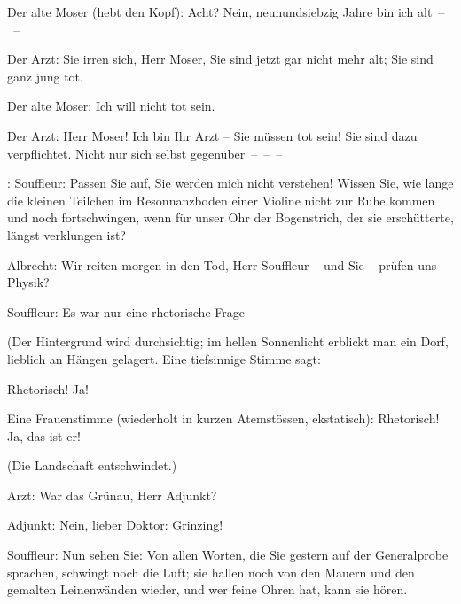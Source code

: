 \pstart
           Der alte Moser (hebt den Kopf): Acht? Nein, neunundsiebzig Jahre bin ich alt – –\pend
           
\pstart
           Der Arzt: Sie irren sich, Herr Moser, Sie sind jetzt gar nicht mehr alt; Sie sind
               ganz jung tot.\pend
           
\pstart
           Der alte Moser: Ich will nicht tot sein.\pend
           
\pstart
           Der Arzt: Herr Moser! Ich bin Ihr Arzt – Sie müssen tot sein! Sie sind dazu
               verpflichtet. Nicht nur sich selbst gegenüber – – –\pend
           
\pstart
           \introOben{}: \introOben{}Souffleur: Passen Sie auf, Sie
               werden mich nicht verstehen! Wissen Sie, wie lange die kleinen Teilchen im
               Resonnanzboden einer Violine nicht zur Ruhe kommen und noch
               fortschwingen, wenn für unser Ohr der Bogenstrich, der sie erschütterte, längst
               verklungen ist?\pend
           
\pstart
           Albrecht: Wir reiten morgen in den Tod, Herr Souffleur – und Sie – prüfen uns
               Physik?\pend
           
\pstart
           {\pb}Souffleur: Es war nur eine
               rhetorische Frage – – –\pend
           
\pstart
           (Der Hintergrund wird durchsichtig; im hellen Sonnenlicht erblickt man ein Dorf,
               lieblich an Hängen gelagert. Eine tiefsinnige Stimme sagt:\pend
           
\pstart
           Rhetorisch! Ja!\pend
           
\pstart
           Eine Frauenstimme (wiederholt in kurzen Atemstössen, ekstatisch): Rhetorisch! Ja, das
               ist er!\pend
           
\pstart
           (Die Landschaft entschwindet.)\pend
           
\pstart
           Arzt: War das Grünau, Herr Adjunkt?\pend
           
\pstart
           Adjunkt: Nein, lieber Doktor: Grinzing!\pend
           
\pstart
           Souffleur: Nun sehen Sie: Von allen Worten, die Sie gestern auf der Generalprobe
               sprachen, schwingt noch die Luft; sie hallen noch von den Mauern und den gemalten
               Leinenwänden wieder, und wer feine Ohren hat, kann sie hören.\pend
           
